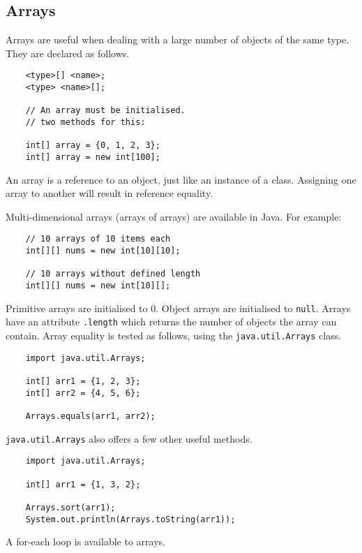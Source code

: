 \documentclass[12pt]{report}
\newcommand{\code}[1]{\lstinline{#1}}
\begin{document}
\begin{flushleft}
\subsection*{Arrays}

Arrays are useful when dealing with a large number of objects of the same type.
They are declared as follows. 

\begin{lstlisting}
    <type>[] <name>;
    <type> <name>[];

    // An array must be initialised.
    // two methods for this:

    int[] array = {0, 1, 2, 3};
    int[] array = new int[100];
\end{lstlisting}

An array is a reference to an object, just like an instance of a class. 
Assigning one array to another will result in reference equality. \par
Multi-dimensional arrays (arrays of arrays) are available in Java. For example:

\begin{lstlisting}
    // 10 arrays of 10 items each
    int[][] nums = new int[10][10];

    // 10 arrays without defined length
    int[][] nums = new int[10][];
\end{lstlisting}

Primitive arrays are initialised to \(0\). Object arrays are initialised to 
\code{null}. Arrays have an attribute \code{.length} which returns the number
of objects the array can contain. Array equality is tested as follows, using
the \code{java.util.Arrays} class.

\begin{lstlisting}
    import java.util.Arrays;

    int[] arr1 = {1, 2, 3};
    int[] arr2 = {4, 5, 6};

    Arrays.equals(arr1, arr2);
\end{lstlisting}

\code{java.util.Arrays} also offers a few other useful methods.

\begin{lstlisting}
    import java.util.Arrays;

    int[] arr1 = {1, 3, 2};

    Arrays.sort(arr1);
    System.out.println(Arrays.toString(arr1));
\end{lstlisting}

A for-each loop is available to arrays.


\end{flushleft}
\end{document}
